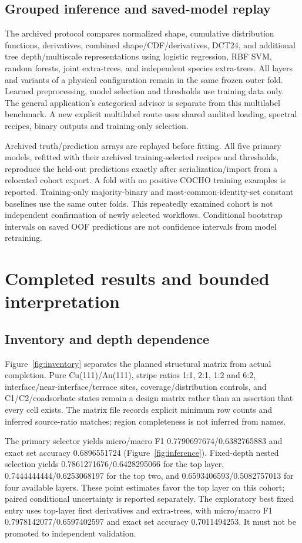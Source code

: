 \documentclass[11pt]{article}
\begin{document}
\subsection{Grouped inference and saved-model replay}
The archived protocol compares normalized shape, cumulative distribution functions, derivatives, combined shape/CDF/derivatives, DCT24, and additional tree depth/multiscale representations using logistic regression, RBF SVM, random forests, joint extra-trees, and independent species extra-trees. All layers and variants of a physical configuration remain in the same frozen outer fold. Learned preprocessing, model selection and thresholds use training data only. The general application's categorical advisor is separate from this multilabel benchmark. A new explicit multilabel route uses shared audited loading, spectral recipes, binary outputs and training-only selection.

Archived truth/prediction arrays are replayed before fitting. All five primary models, refitted with their archived training-selected recipes and thresholds, reproduce the held-out predictions exactly after serialization/import from a relocated cohort export. A fold with no positive COCHO training examples is reported. Training-only majority-binary and most-common-identity-set constant baselines use the same outer folds. This repeatedly examined cohort is not independent confirmation of newly selected workflows. Conditional bootstrap intervals on saved OOF predictions are not confidence intervals from model retraining.

\section{Completed results and bounded interpretation}
\subsection{Inventory and depth dependence}
Figure~\ref{fig:inventory} separates the planned structural matrix from actual completion. Pure Cu(111)/Au(111), stripe ratios 1:1, 2:1, 1:2 and 6:2, interface/near-interface/terrace sites, coverage/distribution controls, and C1/C2/coadsorbate states remain a design matrix rather than an assertion that every cell exists. The matrix file records explicit minimum row counts and inferred source-ratio matches; region completeness is not inferred from names.

The primary selector yields micro/macro F1 0.7790697674/0.6382765883 and exact set accuracy 0.6896551724 (Figure~\ref{fig:inference}). Fixed-depth nested selection yields 0.7861271676/0.6428295066 for the top layer, 0.7444444444/0.6253068197 for the top two, and 0.6593406593/0.5082757013 for four available layers. These point estimates favor the top layer on this cohort; paired conditional uncertainty is reported separately. The exploratory best fixed entry uses top-layer first derivatives and extra-trees, with micro/macro F1 0.7978142077/0.6597402597 and exact set accuracy 0.7011494253. It must not be promoted to independent validation.
\end{document}
